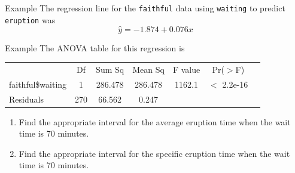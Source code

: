 \begin{frame}{Example}
    The regression line for the \texttt{faithful} data using \texttt{waiting} to predict \texttt{eruption} was
    \[
        \hat{y} = -1.874 + 0.076x
    \]
\end{frame}

\begin{frame}{Example}
    The ANOVA table for this regression is 
    \begin{table}[h]
        \centering
        \begin{tabular}{l cccccc}
             & Df & Sum Sq & Mean Sq & F value  &  Pr($>$F) \\
             \cline{2-6}
            faithful\$waiting & 1 & 286.478 & 286.478 & 1162.1 & $<$ 2.2e-16 \\
            Residuals & 270 & 66.562 & 0.247 & & \\ 
        \end{tabular}
    \end{table}
    \begin{enumerate}
        \item Find the appropriate interval for the average eruption time when the wait time is 70 minutes.
        \item Find the appropriate interval for the specific eruption time when the wait time is 70 minutes.
    \end{enumerate}
\end{frame}
